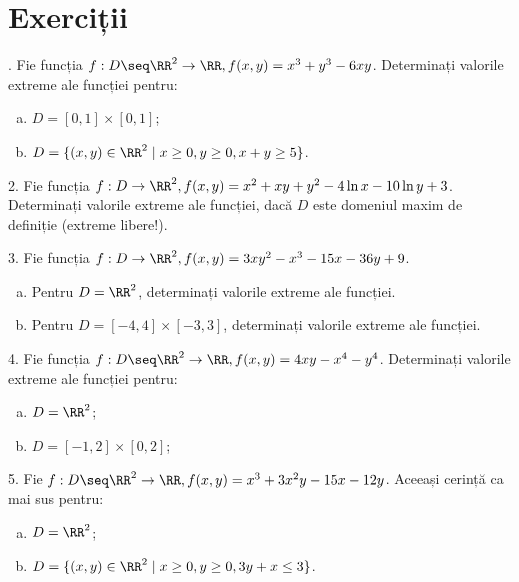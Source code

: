 \section{Exerciții}

\indent{}. Fie funcția $ f : D \seq \RR^2 \to \RR, f(x, y) = x^3 + y^3 - 6xy $.
Determinați valorile extreme ale funcției pentru:
\begin{enumerate}[(a)]
    \item $ D = [0, 1] \times [0, 1] $;
    \item $ D = \{ (x, y) \in \RR^2 \mid x \geq 0, y \geq 0, x + y \geq 5 \} $.
\end{enumerate}

\vspace{0.5cm}

2. Fie funcția $ f : D \to \RR^2, f(x, y) = x^2 + xy + y^2 - 4\ln x - 10\ln y + 3 $.
Determinați valorile extreme ale funcției, dacă $ D $ este domeniul
maxim de definiție (extreme libere!).

\vspace{0.5cm}

3. Fie funcția $ f : D \to \RR^2, f(x, y) = 3xy^2 - x^3 - 15x - 36y + 9 $.
\begin{enumerate}[(a)]
    \item Pentru $ D = \RR^2 $, determinați valorile extreme ale funcției.
    \item Pentru $ D = [-4, 4] \times [-3, 3] $, determinați valorile
        extreme ale funcției.
\end{enumerate}

\vspace{0.5cm}

4. Fie funcția $ f : D \seq \RR^2 \to \RR, f(x, y) = 4xy - x^4 - y^4 $.
Determinați valorile extreme ale funcției pentru:
\begin{enumerate}[(a)]
    \item $ D = \RR^2 $;
    \item $ D = [ -1, 2 ] \times [0, 2] $;
\end{enumerate}

\vspace{0.5cm}

5. Fie $ f : D \seq \RR^2 \to \RR, f(x, y) = x^3 + 3x^2y - 15x - 12y $.
Aceeași cerință ca mai sus pentru:
\begin{enumerate}[(a)]
    \item $ D = \RR^2 $;
    \item $ D = \{ (x, y) \in \RR^2 \mid x \geq 0, y \geq 0, 3y + x \leq 3 \} $.
\end{enumerate}

